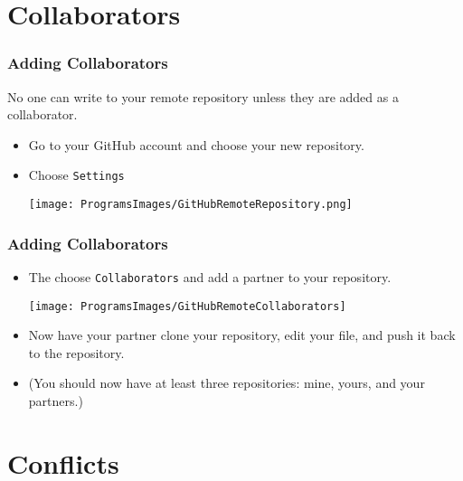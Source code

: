 \documentclass[12pt, compress,xcolor={usenames,dvipsnames}]{beamer} %
\begin{document}
\section{Collaborators}

\begin{frame}\frametitle{Adding Collaborators}
			
	
	No one can write to your remote repository unless they are added as a collaborator.  
	
	\begin{itemize}
		
		\item Go to your GitHub account and choose your new repository.
		
		\item  Choose \texttt{Settings}
		
		\texttt{[image: ProgramsImages/GitHubRemoteRepository.png]}
				
		
	\end{itemize}
	
\end{frame}

\begin{frame}\frametitle{Adding Collaborators}
	\vspace{-4ex}
	
	\begin{itemize}
		
		
		\item The choose \texttt{Collaborators} and add a partner to your repository.
		
		\texttt{[image: ProgramsImages/GitHubRemoteCollaborators]}
		
		\item Now have your partner clone your repository, edit your file, and push it back to the repository.
		
		\item (You should now have at least three repositories:  mine, yours, and your partners.)
		
		
	\end{itemize}
	
\end{frame}

\section{Conflicts}
\end{document}
